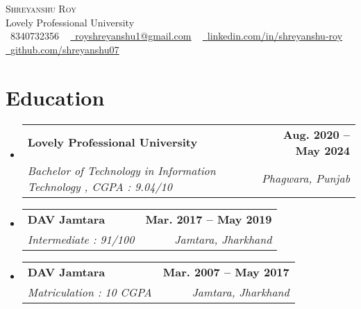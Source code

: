 \documentclass[letterpaper,11pt]{article}
\makeatletter
\newcommand{\resumeSubheading}[4]{
  \vspace{-2pt}\item
    \begin{tabular*}{1.0\textwidth}[t]{l@{\extracolsep{\fill}}r}
      \textbf{#1} & \textbf{\small #2} \\
      \textit{\small#3} & \textit{\small #4} \\
    \end{tabular*}\vspace{-7pt}
}
\newcommand{\resumeSubHeadingListStart}{\begin{itemize}[leftmargin=0.0in, label={}]}
\newcommand{\resumeSubHeadingListEnd}{\end{itemize}}
\makeatother
\begin{document}

\begin{center}
    {\Huge \scshape Shreyanshu Roy} \\ \vspace{1pt}
    Lovely Professional University \\ \vspace{1pt}
    \small \raisebox{-0.1\height}\faPhone\ 8340732356 ~ \href{mailto:royshreyanshu1@gmail.com}{\raisebox{-0.2\height}\faEnvelope\  \underline{royshreyanshu1@gmail.com}} ~ 
    \href{https://linkedin.com/in/shreyanshu-roy/}{\raisebox{-0.2\height}\faLinkedin\ \underline{linkedin.com/in/shreyanshu-roy}}  ~
    \href{https://github.com/shreyanshu07}{\raisebox{-0.2\height}\faGithub\ \underline{github.com/shreyanshu07}}
    \vspace{-8pt}
\end{center}


\section{Education}
  \resumeSubHeadingListStart
    \resumeSubheading
      {Lovely Professional University}{Aug. 2020 -- May 2024}
      {Bachelor of Technology in Information Technology , CGPA : 9.04/10}{Phagwara, Punjab}
    \resumeSubheading
      {DAV Jamtara}{Mar. 2017 -- May 2019}
      {Intermediate : 91/100}{Jamtara, Jharkhand}
    \resumeSubheading
      {DAV Jamtara}{Mar. 2007 -- May 2017}
      {Matriculation : 10 CGPA}{Jamtara, Jharkhand}
  \resumeSubHeadingListEnd

\end{document}
